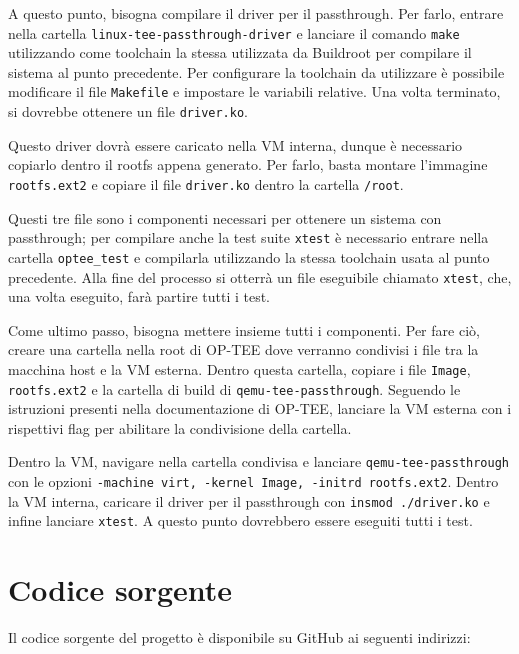 \documentclass[12pt,italian]{report}
\begin{document}
A questo punto, bisogna compilare il driver per il passthrough.
Per farlo, entrare nella cartella \texttt{linux-tee-passthrough-driver}
e lanciare il comando \texttt{make} utilizzando come toolchain la stessa
utilizzata da Buildroot per compilare il sistema al punto precedente.
Per configurare la toolchain da utilizzare è possibile modificare il file
\texttt{Makefile} e impostare le variabili relative.
Una volta terminato, si dovrebbe ottenere un file \texttt{driver.ko}.

Questo driver dovrà essere caricato nella VM interna, dunque è necessario
copiarlo dentro il rootfs appena generato. Per farlo, basta montare l'immagine
\texttt{rootfs.ext2} e copiare il file \texttt{driver.ko} dentro la cartella
\texttt{/root}.

\medbreak

Questi tre file sono i componenti necessari per ottenere un sistema con
passthrough; per compilare anche la test suite \texttt{xtest} è necessario
entrare nella cartella \texttt{optee\_test} e compilarla utilizzando la stessa
toolchain usata al punto precedente.
Alla fine del processo si otterrà un file eseguibile chiamato \texttt{xtest},
che, una volta eseguito, farà partire tutti i test.

\medbreak

Come ultimo passo, bisogna mettere insieme tutti i componenti.
Per fare ciò, creare una cartella nella root di OP-TEE dove verranno condivisi
i file tra la macchina host e la VM esterna.
Dentro questa cartella, copiare i file \texttt{Image}, \texttt{rootfs.ext2}
e la cartella di build di \texttt{qemu-tee-passthrough}.
Seguendo le istruzioni presenti nella documentazione di OP-TEE, lanciare
la VM esterna con i rispettivi flag per abilitare la condivisione della cartella.

\medbreak

Dentro la VM, navigare nella cartella condivisa e lanciare \texttt{qemu-tee-passthrough}
con le opzioni \texttt{-machine virt, -kernel Image, -initrd rootfs.ext2}.
Dentro la VM interna, caricare il driver per il passthrough con \texttt{insmod ./driver.ko}
e infine lanciare \texttt{xtest}.
A questo punto dovrebbero essere eseguiti tutti i test.

\chapter{Codice sorgente}
\label{app:codice-sorgente}
Il codice sorgente del progetto è disponibile su GitHub ai seguenti indirizzi:
\end{document}
